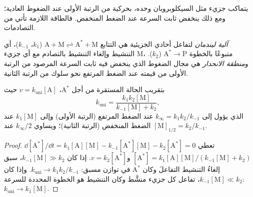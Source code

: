 يتماكب جزيء مثل السيكلوبروبان وحده، بحركية من الرتبة الأولى عند
الضغوط العادية؛ ومع ذلك ينخفض ثابت السرعة عند الضغط المنخفض. فالطاقة
اللازمة تأتي من التصادمات.

\begin{definition}\label{def:b3:complex-kinetics:lindemann}
\emph{آلية ليندمان} لتفاعل أحادي الجزيئية
هي التتابع $\mathrm{A + M \rightleftharpoons A^* + M}$ ($k_1$، $k_{-1}$)، أي التنشيط 
وإلغاء التنشيط بالتصادم مع أي جزيء M، متبوعًا بالخطوة $\mathrm{A^* \to P}$ ($k_2$). 
و\emph{منطقة الانحدار} هي مجال الضغوط الذي ينخفض فيه
ثابت السرعة المرصود من الرتبة الأولى من قيمته عند الضغط المرتفع نحو
سلوك من الرتبة الثانية.
\end{definition}

\begin{theorem}\label{thm:b3:complex-kinetics:lindemann}
بتقريب الحالة المستقرة من أجل $\mathrm{A^*}$، $v = k_{\mathrm{uni}}[\mathrm A]$ حيث
\[
  k_{\mathrm{uni}} = \frac{k_1k_2[\mathrm M]}{k_{-1}[\mathrm M] + k_2},
\]
الذي يؤول إلى $k_\infty = k_1k_2/k_{-1}$ عند الضغط المرتفع (الرتبة الأولى) وإلى $k_1[\mathrm M]$ عند
الضغط المنخفض (الرتبة الثانية)؛ ويساوي $k_\infty/2$ عند $[\mathrm M]_{1/2} = k_2/k_{-1}$.
\end{theorem}

\begin{proof}
$\dd[\mathrm{A^*}]/\dd t = k_1[\mathrm A][\mathrm M] - k_{-1}[\mathrm{A^*}][\mathrm M] - k_2[\mathrm{A^*}] = 0$ تعطي $[\mathrm{A^*}] =
k_1[\mathrm A][\mathrm M]/(k_{-1}[\mathrm M] + k_2)$ و$v = k_2[\mathrm{A^*}]$. إذا كان $k_{-1}[\mathrm M] \gg k_2$، سبق إلغاءُ التنشيط
التفاعلَ وكان $\mathrm{A^*}$ في توازن مسبق: $k_{\mathrm{uni}} \to k_1k_2/k_{-1}$. وإذا كان $k_{-1}[\mathrm M]
\ll k_2$، تفاعل كل جزيء منشَّط وكان التنشيط هو الخطوة المحددة للسرعة:
$k_{\mathrm{uni}} \to k_1[\mathrm M]$.
\end{proof}

